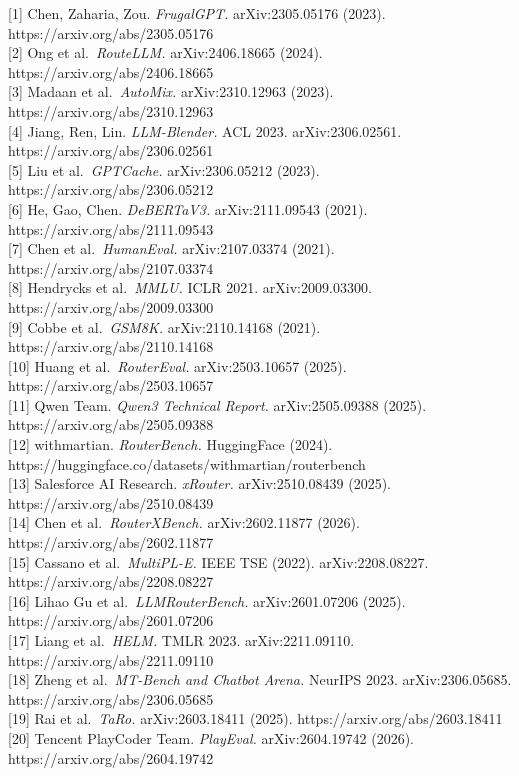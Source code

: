 {[}1{]} Chen, Zaharia, Zou. \emph{FrugalGPT.} arXiv:2305.05176 (2023). https://arxiv.org/abs/2305.05176\\
{[}2{]} Ong et al.~\emph{RouteLLM.} arXiv:2406.18665 (2024). https://arxiv.org/abs/2406.18665\\
{[}3{]} Madaan et al.~\emph{AutoMix.} arXiv:2310.12963 (2023). https://arxiv.org/abs/2310.12963\\
{[}4{]} Jiang, Ren, Lin. \emph{LLM-Blender.} ACL 2023. arXiv:2306.02561. https://arxiv.org/abs/2306.02561\\
{[}5{]} Liu et al.~\emph{GPTCache.} arXiv:2306.05212 (2023). https://arxiv.org/abs/2306.05212\\
{[}6{]} He, Gao, Chen. \emph{DeBERTaV3.} arXiv:2111.09543 (2021). https://arxiv.org/abs/2111.09543\\
{[}7{]} Chen et al.~\emph{HumanEval.} arXiv:2107.03374 (2021). https://arxiv.org/abs/2107.03374\\
{[}8{]} Hendrycks et al.~\emph{MMLU.} ICLR 2021. arXiv:2009.03300. https://arxiv.org/abs/2009.03300\\
{[}9{]} Cobbe et al.~\emph{GSM8K.} arXiv:2110.14168 (2021). https://arxiv.org/abs/2110.14168\\
{[}10{]} Huang et al.~\emph{RouterEval.} arXiv:2503.10657 (2025). https://arxiv.org/abs/2503.10657\\
{[}11{]} Qwen Team. \emph{Qwen3 Technical Report.} arXiv:2505.09388 (2025). https://arxiv.org/abs/2505.09388\\
{[}12{]} withmartian. \emph{RouterBench.} HuggingFace (2024). https://huggingface.co/datasets/withmartian/routerbench\\
{[}13{]} Salesforce AI Research. \emph{xRouter.} arXiv:2510.08439 (2025). https://arxiv.org/abs/2510.08439\\
{[}14{]} Chen et al.~\emph{RouterXBench.} arXiv:2602.11877 (2026). https://arxiv.org/abs/2602.11877\\
{[}15{]} Cassano et al.~\emph{MultiPL-E.} IEEE TSE (2022). arXiv:2208.08227. https://arxiv.org/abs/2208.08227\\
{[}16{]} Lihao Gu et al.~\emph{LLMRouterBench.} arXiv:2601.07206 (2025). https://arxiv.org/abs/2601.07206\\
{[}17{]} Liang et al.~\emph{HELM.} TMLR 2023. arXiv:2211.09110. https://arxiv.org/abs/2211.09110\\
{[}18{]} Zheng et al.~\emph{MT-Bench and Chatbot Arena.} NeurIPS 2023. arXiv:2306.05685. https://arxiv.org/abs/2306.05685\\
{[}19{]} Rai et al.~\emph{TaRo.} arXiv:2603.18411 (2025). https://arxiv.org/abs/2603.18411\\
{[}20{]} Tencent PlayCoder Team. \emph{PlayEval.} arXiv:2604.19742 (2026). https://arxiv.org/abs/2604.19742

